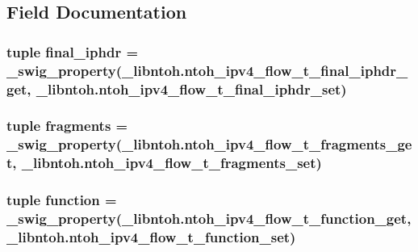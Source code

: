 \subsection{Field Documentation}
\hypertarget{classlibntoh_1_1ntoh__ipv4__flow__t_aaae262685d5063d60668907a4beaf956}{
\subsubsection[{final\-\_\-iphdr}]{\setlength{\rightskip}{0pt plus 5cm}tuple final\-\_\-iphdr = {\bf \-\_\-swig\-\_\-property}(\-\_\-libntoh.\-ntoh\-\_\-ipv4\-\_\-flow\-\_\-t\-\_\-final\-\_\-iphdr\-\_\-get, \-\_\-libntoh.\-ntoh\-\_\-ipv4\-\_\-flow\-\_\-t\-\_\-final\-\_\-iphdr\-\_\-set)\hspace{0.3cm}{\ttfamily [static]}}}\label{classlibntoh_1_1ntoh__ipv4__flow__t_aaae262685d5063d60668907a4beaf956}
\hypertarget{classlibntoh_1_1ntoh__ipv4__flow__t_a61a562f6a662704721df2bd666792d24}{
\subsubsection[{fragments}]{\setlength{\rightskip}{0pt plus 5cm}tuple fragments = {\bf \-\_\-swig\-\_\-property}(\-\_\-libntoh.\-ntoh\-\_\-ipv4\-\_\-flow\-\_\-t\-\_\-fragments\-\_\-get, \-\_\-libntoh.\-ntoh\-\_\-ipv4\-\_\-flow\-\_\-t\-\_\-fragments\-\_\-set)\hspace{0.3cm}{\ttfamily [static]}}}\label{classlibntoh_1_1ntoh__ipv4__flow__t_a61a562f6a662704721df2bd666792d24}
\hypertarget{classlibntoh_1_1ntoh__ipv4__flow__t_a543077174a1281b9d00884a11a040629}{
\subsubsection[{function}]{\setlength{\rightskip}{0pt plus 5cm}tuple function = {\bf \-\_\-swig\-\_\-property}(\-\_\-libntoh.\-ntoh\-\_\-ipv4\-\_\-flow\-\_\-t\-\_\-function\-\_\-get, \-\_\-libntoh.\-ntoh\-\_\-ipv4\-\_\-flow\-\_\-t\-\_\-function\-\_\-set)\hspace{0.3cm}{\ttfamily [static]}}}\label{classlibntoh_1_1ntoh__ipv4__flow__t_a543077174a1281b9d00884a11a040629}
